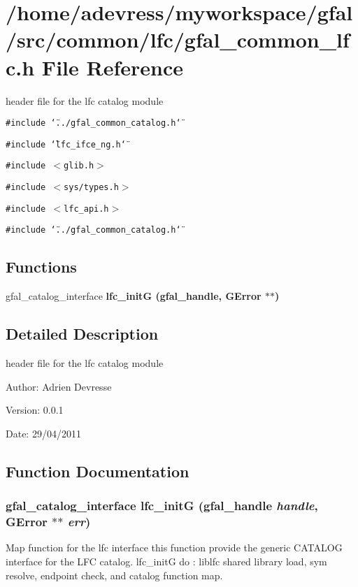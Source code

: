 \section{/home/adevress/myworkspace/gfal/src/common/lfc/gfal\_\-common\_\-lfc.h File Reference}
\label{gfal__common__lfc_8h}
header file for the lfc catalog module 

{\tt \#include \char`\"{}../gfal\_\-common\_\-catalog.h\char`\"{}}\par
{\tt \#include \char`\"{}lfc\_\-ifce\_\-ng.h\char`\"{}}\par
{\tt \#include $<$glib.h$>$}\par
{\tt \#include $<$sys/types.h$>$}\par
{\tt \#include $<$lfc\_\-api.h$>$}\par
{\tt \#include \char`\"{}../gfal\_\-common\_\-catalog.h\char`\"{}}\par
\subsection*{Functions}
\begin{CompactItemize}
\item 
gfal\_\-catalog\_\-interface \bf{lfc\_\-init\-G} (gfal\_\-handle, GError $\ast$$\ast$)
\end{CompactItemize}


\subsection{Detailed Description}
header file for the lfc catalog module 

\begin{Desc}
\item[Author:]Adrien Devresse \end{Desc}
\begin{Desc}
\item[Version:]0.0.1 \end{Desc}
\begin{Desc}
\item[Date:]29/04/2011 \end{Desc}


\subsection{Function Documentation}
\subsubsection{\setlength{\rightskip}{0pt plus 5cm}gfal\_\-catalog\_\-interface lfc\_\-init\-G (gfal\_\-handle {\em handle}, GError $\ast$$\ast$ {\em err})}\label{gfal__common__lfc_8h_0d4af55002fa4216f9915b5a1a721ef4}


Map function for the lfc interface this function provide the generic CATALOG interface for the LFC catalog. lfc\_\-init\-G do : liblfc shared library load, sym resolve, endpoint check, and catalog function map. 